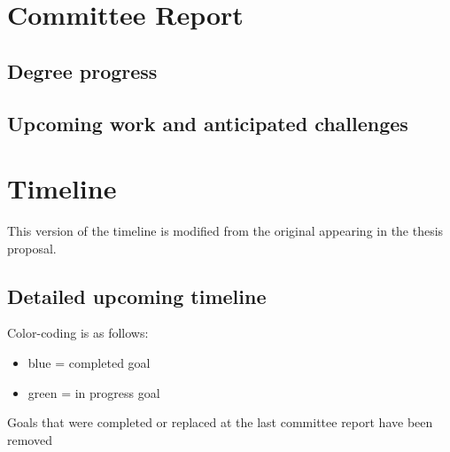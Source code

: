 \documentclass[11pt]{article}
\begin{document}
    
    \section*{Committee Report}


    \subsection*{Degree progress}

    
    \subsection*{Upcoming work and anticipated challenges}
    


\section*{Timeline}

This version of the timeline is modified from the original appearing in the thesis proposal. 

\subsection*{Detailed upcoming timeline}
Color-coding is as follows:
    
    \begin{itemize}
    	\item {\color{RoyalBlue}blue} = completed goal
    	\item {\color{ForestGreen} green} = in progress goal
    \end{itemize}

Goals that were completed or replaced at the last committee report have been removed
\end{document}
